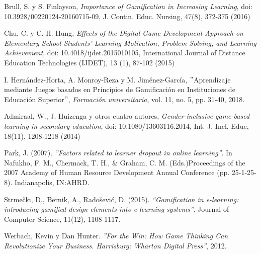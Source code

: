 \begin{thebibliography}{9}
        Brull, S. y S. Finlayson, 
        \textit{Importance of Gamification in Increasing Learning},
        doi: 10.3928/00220124-20160715-09,
        J. Contin. Educ. Nursing, 47(8), 372-375 (2016)
    
        Chu, C. y C. H. Hung, 
        \textit{Effects of the Digital Game-Development Approach on Elementary School Students’ Learning Motivation, Problem Solving, and Learning Achievement}, doi: 10.4018/ijdet.2015010105, International Journal of Distance Education Technologies (IJDET), 13 (1), 87-102 (2015)
        
        I. Hernández-Horta, A. Monroy-Reza y M. Jiménez-García,   
        $"$Aprendizaje mediante Juegos basados en Principios de Gamificación en Instituciones de Educación Superior$"$, \textit{Formación universitaria}, vol. 11, no. 5, pp. 31-40, 2018.
        
        Admiraal, W., J. Huizenga y otros cuatro autores, 
        \textit{Gender-inclusive game-based learning in secondary education}, doi: 10.1080/13603116.2014, Int. J. Incl. Educ, 18(11), 1208-1218 (2014)
    
        Park, J. (2007). {\it ''Factors related to learner dropout in online learning''}. In Nafukho, F. M., Chermack, T. H., \& Graham, C. M. (Eds.)Proceedings of the 2007 Academy of Human Resource Development Annual Conference (pp. 25-1-25-8). Indianapolis, IN:AHRD.
    
        Strmečki, D., Bernik, A., Radošević, D. (2015). {\it ``Gamification in e-learning: introducing gamified design elements into e-learning systems''}. Journal of Computer Science, 11(12), 1108-1117.

        Werbach, Kevin y Dan Hunter. \textit{''For the Win: How Game Thinking Can Revolutionize Your Business. Harrisburg: Wharton Digital Press''}, 2012.


\end{thebibliography}
